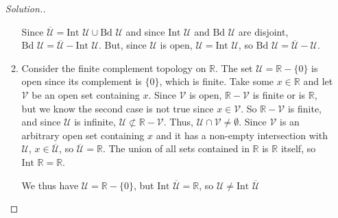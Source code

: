 \documentclass{article}
\newcommand{\U}{\mathcal{U}}
\newcommand{\R}{\mathbb{R}}
\newcommand{\V}{\mathcal{V}}
\newcommand{\sk}{\smallskip}
\begin{document}
\begin{enumerate}
\begin{proof}[Solution.]
\begin{enumerate}
            \sk

            Since $\overline{\U} = \text{Int }\U \cup \text{Bd }\U$ and since $\text{Int }\U$ and $\text{Bd }\U$ are disjoint, $\text{Bd }\U = \overline{\U} - \text{Int }\U$. But, since $\U$ is open, $\U = \text{Int }\U$, so $\text{Bd }\U = \overline{\U} - \U$.

            \item Consider the finite complement topology on $\R$. The set $\U = \R - \{0\}$ is open since its complement is $\{0\}$, which is finite. Take some $x \in \R$ and let $\V$ be an open set containing $x$. Since $\V$ is open, $\R - \V$ is finite or is $\R$, but we know the second case is not true since $x \in \V$. So $\R - \V$ is finite, and since $\U$ is infinite, $\U \not\subset \R - \V$. Thus, $\U \cap \V \neq \emptyset$. Since $\V$ is an arbitrary open set containing $x$ and it has a non-empty intersection with $\U$, $x \in \overline{\U}$, so $\overline{\U} = \R$. The union of all sets contained in $\R$ is $\R$ itself, so $\text{Int }\R = \R$.

            \sk

            We thus have $\U = \R - \{0\}$, but $\text{Int }\overline{\U} = \R$, so $\U \neq \text{Int }\overline{\U}$
        \end{enumerate}
    \end{proof}
\end{enumerate}
\end{document}

